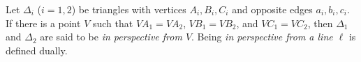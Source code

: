 Let $\Delta_i$ ($i=1,2$) be triangles with vertices $A_i, B_i, C_i$ and opposite edges $a_i, b_i, c_i$. If there is a point $V$ such that $VA_1 = VA_2$, $VB_1 = VB_2$, and $VC_1 = VC_2$, then $\Delta_1$ and $\Delta_2$ are said to be \emph{in perspective from $V$}. Being \emph{in perspective from a line $\ell$} is defined dually.
